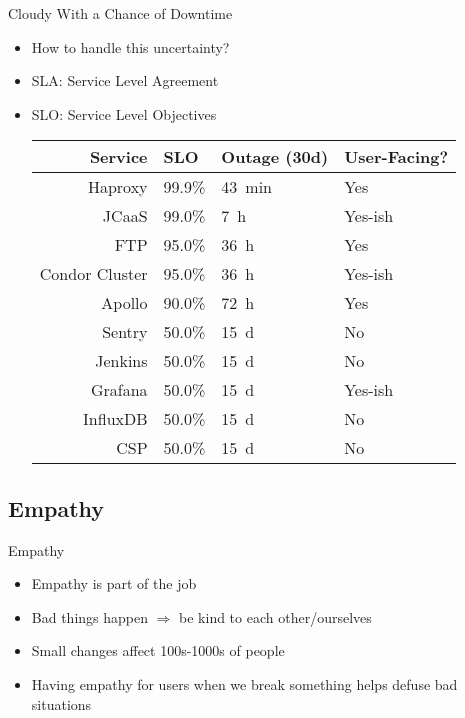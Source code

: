 \documentclass[12pt]{ufrslides}
\begin{document}
\begin{frame}{Cloudy With a Chance of Downtime}
	\begin{itemize}
		\item How to handle this uncertainty?
		\item SLA: Service Level Agreement
		\item SLO: Service Level Objectives
			\vfill
			\begin{tabular}{rlll}
				Service        & SLO    & Outage (30d) & User-Facing? \\ \hline
			Haproxy        & 99.9\% & \SI{43}{\minute}   & Yes          \\
			JCaaS          & 99.0\% & \SI{7}{\hour}      & Yes-ish      \\
			FTP            & 95.0\% & \SI{36}{\hour}     & Yes          \\
			Condor Cluster & 95.0\% & \SI{36}{\hour}     & Yes-ish      \\
			Apollo         & 90.0\% & \SI{72}{\hour}     & Yes          \\
			Sentry         & 50.0\% & \SI{15}{\day}      & No           \\
			Jenkins        & 50.0\% & \SI{15}{\day}      & No           \\
			Grafana        & 50.0\% & \SI{15}{\day}      & Yes-ish      \\
			InfluxDB       & 50.0\% & \SI{15}{\day}      & No           \\
			CSP            & 50.0\% & \SI{15}{\day}      & No           \\
		\end{tabular}
	\end{itemize}
\end{frame}


\subsection{Empathy}
\begin{frame}{Empathy}
	\begin{itemize}
		\item Empathy is part of the job
		\item Bad things happen $\Rightarrow$ be kind to each other/ourselves
		\item Small changes affect 100s-1000s of people
		\item Having empathy for users when we break something helps defuse bad situations
	\end{itemize}
\end{frame}
\end{document}
